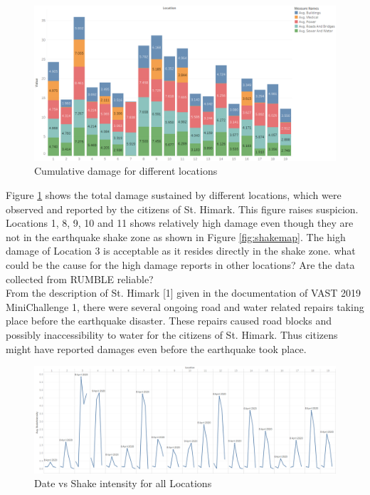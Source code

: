 \documentclass[12pt]{extarticle}
\begin{document}
\begin{figure}[H]
\centering
	\includegraphics[width=\linewidth]{Images/AllDamage.png}
	\caption{Cumulative damage for different locations }
	\label{fig:alldamage}
\end{figure}

Figure \ref{fig:alldamage} shows the total damage sustained by different locations, which were observed and reported by the citizens of St. Himark. This figure raises suspicion. Locations 1, 8, 9, 10 and 11 shows relatively high damage even though they are not in the earthquake shake zone as shown in Figure \ref{fig:shakemap}. The high damage of Location 3 is acceptable as it resides directly in the shake zone. what could be the cause for the high damage reports in other locations? Are the data collected from RUMBLE reliable? \\

From the description of St. Himark [1] given in the documentation of VAST 2019 MiniChallenge 1, there were several ongoing road and water related repairs taking place before the earthquake disaster. These repairs caused road blocks and possibly inaccessibility to water for the citizens of St. Himark. Thus citizens might have reported damages even before the earthquake took place. \\
 


\begin{figure}[H]
\centering
	\includegraphics[width=\linewidth]{Images/Date.png}
	\caption{Date vs Shake intensity for all Locations }
	\label{fig:date}
\end{figure}
\end{document}

